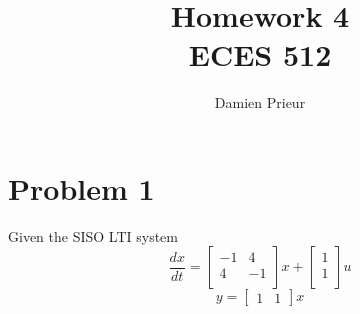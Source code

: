 \documentclass{article}
\author{Damien Prieur}
\title{Homework 4\\ ECES 512}
\date{}
\begin{document}
\maketitle

\section*{Problem 1}
Given the SISO LTI system
$$
\frac{dx}{dt} =
\begin{bmatrix}
-1 &  4 \\
 4 & -1 \\
\end{bmatrix}
x +
\begin{bmatrix}
1 \\
1 \\
\end{bmatrix}
u
$$
$$ y = \begin{bmatrix} 1 & 1 \end{bmatrix} x $$
\end{document}
